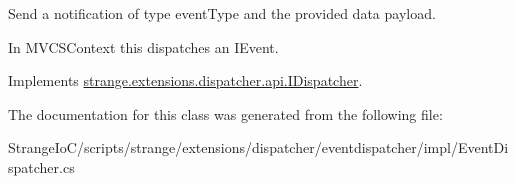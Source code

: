 Send a notification of type event\-Type and the provided data payload. 

In M\-V\-C\-S\-Context this dispatches an I\-Event. 

Implements \hyperlink{interfacestrange_1_1extensions_1_1dispatcher_1_1api_1_1_i_dispatcher_a71f605859b2507f1248190fe37d96eed}{strange.\-extensions.\-dispatcher.\-api.\-I\-Dispatcher}.



The documentation for this class was generated from the following file\-:\begin{DoxyCompactItemize}
\item 
Strange\-Io\-C/scripts/strange/extensions/dispatcher/eventdispatcher/impl/Event\-Dispatcher.\-cs\end{DoxyCompactItemize}
